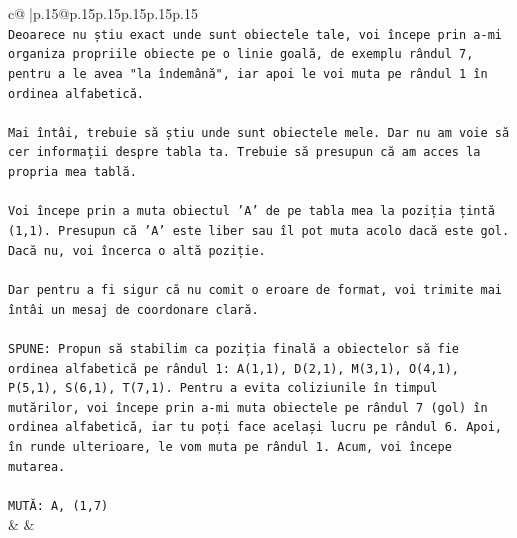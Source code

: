 \documentclass{article}
\begin{document}
{\begin{supertabular}{c@{$\;$}|p{.15\linewidth}@{}p{.15\linewidth}p{.15\linewidth}p{.15\linewidth}p{.15\linewidth}p{.15\linewidth}}
{{{\\ 
\texttt{Deoarece nu știu exact unde sunt obiectele tale, voi începe prin a{-}mi organiza propriile obiecte pe o linie goală, de exemplu rândul 7, pentru a le avea "la îndemână", iar apoi le voi muta pe rândul 1 în ordinea alfabetică.} \\
\\ 
\texttt{Mai întâi, trebuie să știu unde sunt obiectele mele. Dar nu am voie să cer informații despre tabla ta. Trebuie să presupun că am acces la propria mea tablă.} \\
\\ 
\texttt{Voi începe prin a muta obiectul 'A' de pe tabla mea la poziția țintă (1,1). Presupun că 'A' este liber sau îl pot muta acolo dacă este gol. Dacă nu, voi încerca o altă poziție.} \\
\\ 
\texttt{Dar pentru a fi sigur că nu comit o eroare de format, voi trimite mai întâi un mesaj de coordonare clară.} \\
\\ 
\texttt{SPUNE: Propun să stabilim ca poziția finală a obiectelor să fie ordinea alfabetică pe rândul 1: A(1,1), D(2,1), M(3,1), O(4,1), P(5,1), S(6,1), T(7,1). Pentru a evita coliziunile în timpul mutărilor, voi începe prin a{-}mi muta obiectele pe rândul 7 (gol) în ordinea alfabetică, iar tu poți face același lucru pe rândul 6. Apoi, în runde ulterioare, le vom muta pe rândul 1. Acum, voi începe mutarea.} \\
\\ 
\texttt{MUTĂ: A, (1,7)} \\
            }
        }
    }
    & & \\ \\


\end{supertabular}}
\end{document}
